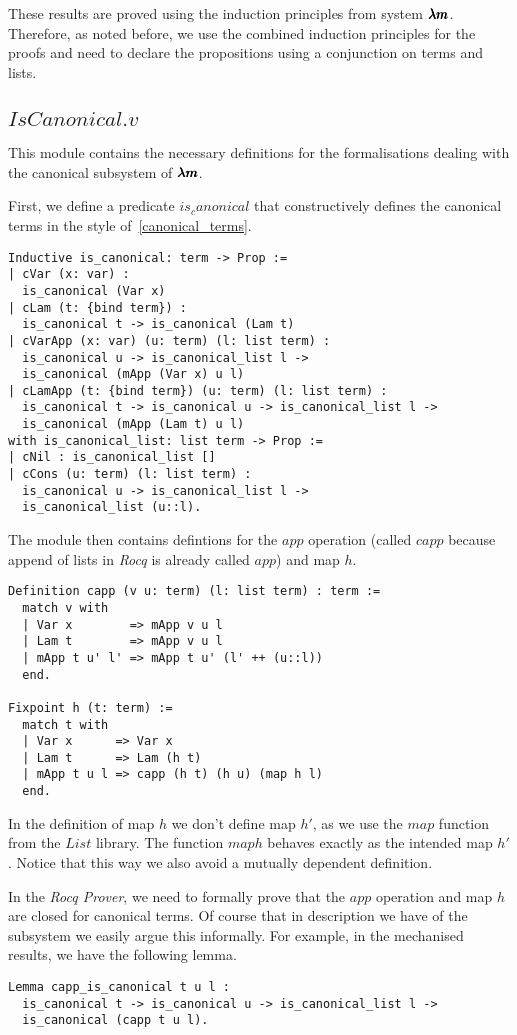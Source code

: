 These results are proved using the induction principles from system $\pmb{\lambda m}$.
Therefore, as noted before, we use the combined induction principles for the proofs and need to declare the propositions using a conjunction on terms and lists.

\subsection{\lst$IsCanonical.v$}

This module contains the necessary definitions for the formalisations dealing with the canonical subsystem of $\pmb{\lambda m}$.

First, we define a predicate \lst$is_canonical$ that constructively defines the canonical terms in the style of~\cref{canonical_terms}.
\begin{lstlisting}[language=Coq]
Inductive is_canonical: term -> Prop :=
| cVar (x: var) :
  is_canonical (Var x)
| cLam (t: {bind term}) :
  is_canonical t -> is_canonical (Lam t)
| cVarApp (x: var) (u: term) (l: list term) :
  is_canonical u -> is_canonical_list l ->
  is_canonical (mApp (Var x) u l)
| cLamApp (t: {bind term}) (u: term) (l: list term) :
  is_canonical t -> is_canonical u -> is_canonical_list l ->
  is_canonical (mApp (Lam t) u l)
with is_canonical_list: list term -> Prop :=
| cNil : is_canonical_list []
| cCons (u: term) (l: list term) :
  is_canonical u -> is_canonical_list l ->
  is_canonical_list (u::l).
\end{lstlisting}

The module then contains defintions for the $app$ operation (called \lst$capp$ because append of lists in \textit{Rocq} is already called \lst$app$) and map $h$.
\begin{lstlisting}[language=Coq]
Definition capp (v u: term) (l: list term) : term :=
  match v with
  | Var x        => mApp v u l
  | Lam t        => mApp v u l
  | mApp t u' l' => mApp t u' (l' ++ (u::l))
  end.

Fixpoint h (t: term) :=
  match t with
  | Var x      => Var x
  | Lam t      => Lam (h t)
  | mApp t u l => capp (h t) (h u) (map h l)
  end.
\end{lstlisting}
In the definition of map $h$ we don't define map $h'$, as we use the \lst$map$ function from the \lst$List$ library.
The function \lst$map h$ behaves exactly as the intended map $h'$.
Notice that this way we also avoid a mutually dependent definition.

In the \textit{Rocq Prover}, we need to formally prove that the $app$ operation and map $h$ are closed for canonical terms.
Of course that in description we have of the subsystem we easily argue this informally. For example, in the mechanised results, we have the following lemma.
\begin{lstlisting}[language=Coq]
Lemma capp_is_canonical t u l :
  is_canonical t -> is_canonical u -> is_canonical_list l ->
  is_canonical (capp t u l).
\end{lstlisting}

